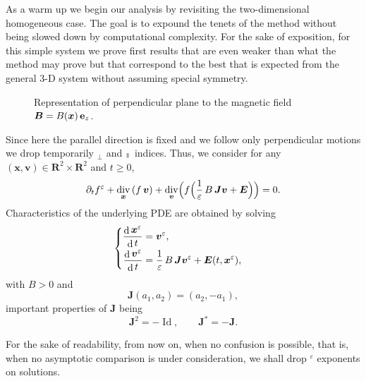 \documentclass[JEP,XML,SOM,Unicode]{cedram}
\newenvironment{splitcases}
{\begin{cases}\begin{aligned}}
{\end{aligned}\end{cases}}
\newcommand{\sperp}{{\scriptscriptstyle\perp}}
\let\eps\varepsilon
\let\d\partial
\DeclareMathOperator\dD{d}\let\dd\dD
\DeclareMathOperator{\Id}{Id}
\DeclareMathOperator{\Div}{div}
\theoremstyle{plain}
\theoremstyle{definition}
\newcommand{\be}{\begin{equation}}
\newcommand{\ee}{\end{equation}}
\newcommand\R{\mathbf R}
\newcommand\bB{{\boldsymbol B}}
\newcommand\bE{{\boldsymbol E}}
\newcommand\bJ{{\boldsymbol J}}
\newcommand\bfv{{\boldsymbol v}}
\newcommand\bfx{{\boldsymbol x}}
\newcommand{\mypar}{{\mkern3mu\vphantom{\perp}\vrule depth 0pt\mkern2mu\vrule depth 0pt\mkern3mu}}
\begin{document}
As a warm up we begin our analysis by revisiting the two-dimensional homogeneous case. The goal is to expound the tenets of the method without being slowed down by computational complexity. For the sake of exposition, for this simple system we prove first results that are even weaker than what the method may prove but that correspond to the best that is expected from the general $3$-D system without assuming special symmetry.
\begin{figure}[ht!]
\begin{center}
\end{center}
\label{fig:2}
\vspace*{-.5\baselineskip}%
\caption{\smaller Representation of perpendicular plane to the magnetic
field $\bB= B(\bfx)\,{\bf e}_z$.}
\end{figure}

Since here the parallel direction is fixed and we follow only
perpendicular motions we drop temporarily ${}_\sperp$ and ${}_\mypar$
indices. Thus, we consider for any $(\bfx,\bfv)\in\R^2\times\R^2$ and
$t\geq 0$,
\be
\label{eq:vla2d}
\d_t f^\eps+\Div_\bfx \left(f\,\bfv\right)
+\Div_{\bfv}\Bigl(f\Bigl(\frac1\eps\,B\,\bJ\bfv +\bE\Bigr)\Bigr)
=0.
\ee
Characteristics of the underlying PDE are obtained by solving
\be\label{eq:xv-hom}
\begin{splitcases}
\frac{\dD\bfx^\eps}{\dD t}&=\bfv^\eps,
\\
\frac{\dD\bfv^\eps}{\dD t}&=\frac{1}{\eps}\,B\,\bJ\bfv^\eps+\bE(t,\bfx^\eps),
\end{splitcases}
\ee
with $B>0$ and
\[
\bJ\left(a_1,a_2\right)=(a_2,-a_1),
\]
important properties of $\bJ$ being
\[
\bJ^2=-\Id,
\qquad
\bJ^*=-\bJ.
\]

For the sake of readability, from now on, when no confusion is possible, that is, when no asymptotic comparison is under consideration, we shall drop ${}^\eps$ exponents on solutions.
\end{document}
